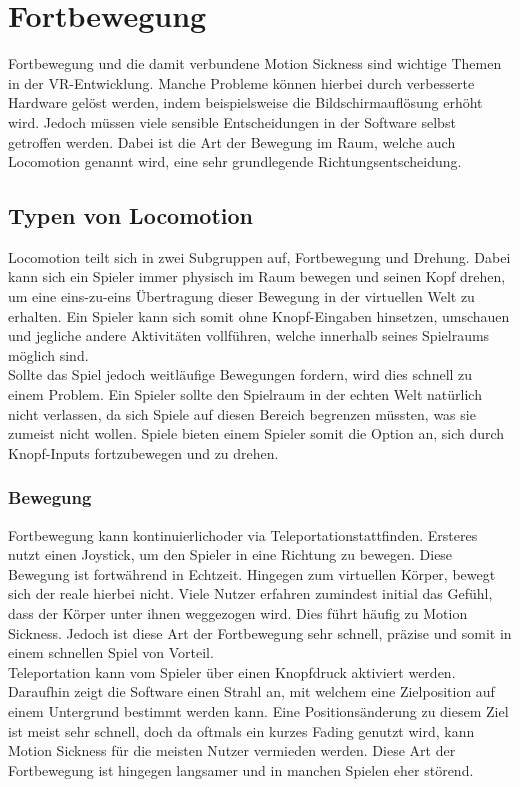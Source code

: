 \section{Fortbewegung}
Fortbewegung und die damit verbundene Motion Sickness sind wichtige Themen in der VR-Entwicklung. Manche Probleme können hierbei durch verbesserte Hardware gelöst werden, indem beispielsweise die Bildschirmauflösung erhöht wird. Jedoch müssen viele sensible Entscheidungen in der Software selbst getroffen werden. Dabei ist die Art der Bewegung im Raum, welche auch Locomotion genannt wird, eine sehr grundlegende Richtungsentscheidung.

\subsection{Typen von Locomotion}
Locomotion teilt sich in zwei Subgruppen auf, Fortbewegung und Drehung. Dabei kann sich ein Spieler immer physisch im Raum bewegen und seinen Kopf drehen, um eine eins-zu-eins Übertragung dieser Bewegung in der virtuellen Welt zu erhalten. Ein Spieler kann sich somit ohne Knopf-Eingaben hinsetzen, umschauen und jegliche andere Aktivitäten vollführen, welche innerhalb seines Spielraums möglich sind.\\
Sollte das Spiel jedoch weitläufige Bewegungen fordern, wird dies schnell zu einem Problem. Ein Spieler sollte den Spielraum in der echten Welt natürlich nicht verlassen, da sich Spiele auf diesen Bereich begrenzen müssten, was sie zumeist nicht wollen. Spiele bieten einem Spieler somit die Option an, sich durch Knopf-Inputs fortzubewegen und zu drehen.
\subsubsection{Bewegung}
Fortbewegung kann \dq kontinuierlich\dq oder via \dq Teleportation\dq stattfinden. Ersteres nutzt einen Joystick, um den Spieler in eine Richtung zu bewegen. Diese Bewegung ist fortwährend in Echtzeit. Hingegen zum virtuellen Körper, bewegt sich der reale hierbei nicht. Viele Nutzer erfahren zumindest initial das Gefühl, dass der Körper unter ihnen weggezogen wird. Dies führt häufig zu Motion Sickness. Jedoch ist diese Art der Fortbewegung sehr schnell, präzise und somit in einem schnellen Spiel von Vorteil.\\
Teleportation kann vom Spieler über einen Knopfdruck aktiviert werden. Daraufhin zeigt die Software einen Strahl an, mit welchem eine Zielposition auf einem Untergrund bestimmt werden kann. Eine Positionsänderung zu diesem Ziel ist meist sehr schnell, doch da oftmals ein kurzes Fading genutzt wird, kann Motion Sickness für die meisten Nutzer vermieden werden. Diese Art der Fortbewegung ist hingegen langsamer und in manchen Spielen eher störend.

